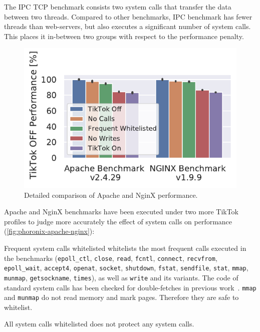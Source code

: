 \documentclass[conference]{IEEEtran}
\newcommand{\sysname}{TikTok}
\begin{document}
The IPC TCP benchmark consists two system calls that transfer the data between
two threads. Compared to other benchmarks, IPC benchmark has fewer threads than
web-servers, but also executes a significant number of system calls. This places
it in-between two groups with respect to the performance penalty.

\begin{figure}[]
  \centering
  \includegraphics[width=\linewidth]{img/freq_removed.pdf}
  \caption{Detailed comparison of Apache and NginX performance.}
  \label{fig:phoronix-apache-nginx}
\end{figure}

Apache and NginX benchmarks have been executed under two more \sysname{}
profiles to judge more accurately the effect of system calls on performance
(\autoref{fig:phoronix-apache-nginx}):

\begin{LaTeXdescription}
  \item[Frequent system calls whitelisted] whitelists the most frequent calls
  executed in the benchmarks (\texttt{epoll\_ctl}, \texttt{close},
  \texttt{read}, \texttt{fcntl}, \texttt{connect}, \texttt{recvfrom},
  \texttt{epoll\_wait}, \texttt{accept4}, \texttt{openat}, \texttt{socket},
  \texttt{shutdown}, \texttt{fstat}, \texttt{sendfile}, \texttt{stat},
  \texttt{mmap}, \texttt{munmap}, \texttt{getsockname}, \texttt{times}), as well
  as \texttt{write} and its variants. The code of standard system calls has been
  checked for double-fetches in previous work~\cite{wang2017double,
  xu2018precise}. \texttt{mmap} and \texttt{munmap} do not read memory and mark
  pages. Therefore they are safe to whitelist.


  \item[All system calls whitelisted] does not protect any system calls.
\end{LaTeXdescription}
\end{document}
